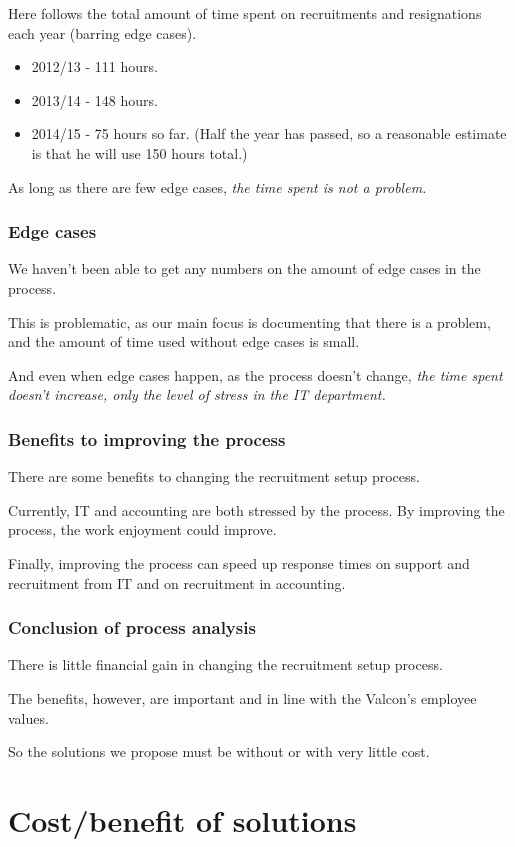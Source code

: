 Here follows the total amount of time spent on recruitments and resignations each year (barring edge cases).
\begin{itemize}
\item 2012/13 - 111 hours.
\item 2013/14 - 148 hours.
\item 2014/15 - 75 hours so far. (Half the year has passed, so a reasonable estimate is that he will use 150 hours total.)
\end{itemize}

As long as there are few edge cases, \emph{the time spent is not a problem.}

\subsubsection{Edge cases}
We haven't been able to get any numbers on the amount of edge cases in the process.

This is problematic, as our main focus is documenting that there is a problem, and the amount of time used without edge cases is small.

And even when edge cases happen, as the process doesn't change, \emph{the time spent doesn't increase, only the level of stress in the IT department.}

\subsubsection{Benefits to improving the process}
There are some benefits to changing the recruitment setup process.

Currently, IT and accounting are both stressed by the process.
By improving the process, the work enjoyment could improve.

Finally, improving the process can speed up response times on support and recruitment from IT and on recruitment in accounting.

\subsubsection{Conclusion of process analysis}
There is little financial gain in changing the recruitment setup process.

The benefits, however, are important and in line with the Valcon's employee values.

So the solutions we propose must be without or with very little cost.

\section{Cost/benefit of solutions}